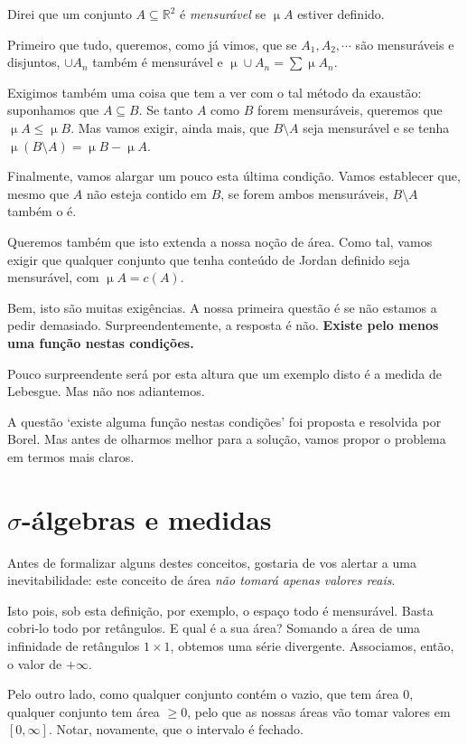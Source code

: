 \documentclass{article}
\newcommand{\R}{\mathbb{R}}
\DeclareMathOperator{\mmu}{\mu}
\begin{document}
Direi que um conjunto $A \subseteq \R^2$ é \emph{mensurável} se $\mmu A$ estiver definido.

Primeiro que tudo, queremos, como já vimos, que se $A_1, A_2, \cdots$ são mensuráveis e disjuntos, $\cup A_n$ também é mensurável e $\mmu \cup A_n = \sum \mmu A_n$.

Exigimos também uma coisa que tem a ver com o tal método da exaustão: suponhamos que $A \subseteq B$. Se tanto $A$ como $B$ forem mensuráveis, queremos que $\mmu A \leq \mmu B$. Mas vamos exigir, ainda mais, que $B \setminus A$ seja mensurável e se tenha $\mmu (B \setminus A) = \mmu B - \mmu A$.

Finalmente, vamos alargar um pouco esta última condição. Vamos establecer que, mesmo que $A$ não esteja contido em $B$, se forem ambos mensuráveis, $B \setminus A$ também o é.

Queremos também que isto extenda a nossa noção de área. Como tal, vamos exigir que qualquer conjunto que tenha conteúdo de Jordan definido seja mensurável, com $\mmu A = c(A)$.

Bem, isto são muitas exigências. A nossa primeira questão é se não estamos a pedir demasiado. Surpreendentemente, a resposta é não. \textbf{Existe pelo menos uma função nestas condições.}

Pouco surpreendente será por esta altura que um exemplo disto é a medida de Lebesgue. Mas não nos adiantemos.

A questão `existe alguma função nestas condições' foi proposta e resolvida por Borel. Mas antes de olharmos melhor para a solução, vamos propor o problema em termos mais claros.

\section{$\sigma$-álgebras e medidas}

Antes de formalizar alguns destes conceitos, gostaria de vos alertar a uma inevitabilidade: este conceito de área \emph{não tomará apenas valores reais}.

Isto pois, sob esta definição, por exemplo, o espaço todo é mensurável. Basta cobri-lo todo por retângulos. E qual é a sua área? Somando a área de uma infinidade de retângulos $1 \times 1$, obtemos uma série divergente. Associamos, então, o valor de $+ \infty$.

Pelo outro lado, como qualquer conjunto contém o vazio, que tem área 0, qualquer conjunto tem área $\geq 0$, pelo que as nossas áreas vão tomar valores em $[0, \infty]$. Notar, novamente, que o intervalo é fechado.
\end{document}
